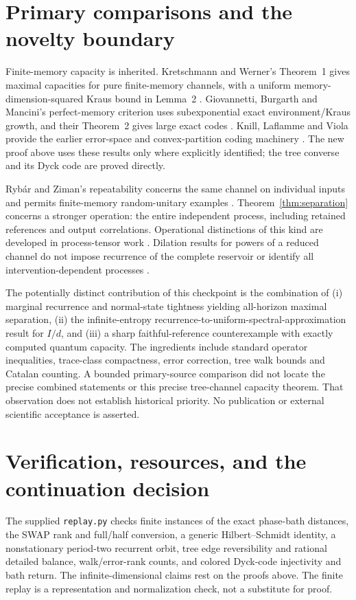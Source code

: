 \documentclass[11pt]{article}
\theoremstyle{definition}\newtheorem{definition}[theorem]{Definition}
\begin{document}
\section{Primary comparisons and the novelty boundary}

Finite-memory capacity is inherited. Kretschmann and Werner's Theorem~1 gives maximal capacities for pure finite-memory channels, with a uniform memory-dimension-squared Kraus bound in Lemma~2 \cite{KW}. Giovannetti, Burgarth and Mancini's perfect-memory criterion uses subexponential exact environment/Kraus growth, and their Theorem~2 gives large exact codes \cite{GBM}. Knill, Laflamme and Viola provide the earlier error-space and convex-partition coding machinery \cite{KLV}. The new proof above uses these results only where explicitly identified; the tree converse and its Dyck code are proved directly.

Ryb\'ar and Ziman's repeatability concerns the same channel on individual inputs and permits finite-memory random-unitary examples \cite{RZ}. Theorem~\ref{thm:separation} concerns a stronger operation: the entire independent process, including retained references and output correlations. Operational distinctions of this kind are developed in process-tensor work \cite{Pollock}. Dilation results for powers of a reduced channel do not impose recurrence of the complete reservoir or identify all intervention-dependent processes \cite{EndeDirr}.

The potentially distinct contribution of this checkpoint is the combination of (i) marginal recurrence and normal-state tightness yielding all-horizon maximal separation, (ii) the infinite-entropy recurrence-to-uniform-spectral-approximation result for $I/d$, and (iii) a sharp faithful-reference counterexample with exactly computed quantum capacity. The ingredients include standard operator inequalities, trace-class compactness, error correction, tree walk bounds and Catalan counting. A bounded primary-source comparison did not locate the precise combined statements or this precise tree-channel capacity theorem. That observation does not establish historical priority. No publication or external scientific acceptance is asserted.

\section{Verification, resources, and the continuation decision}

The supplied \texttt{replay.py} checks finite instances of the exact phase-bath distances, the SWAP rank and full/half conversion, a generic Hilbert--Schmidt identity, a nonstationary period-two recurrent orbit, tree edge reversibility and rational detailed balance, walk/error-rank counts, and colored Dyck-code injectivity and bath return. The infinite-dimensional claims rest on the proofs above. The finite replay is a representation and normalization check, not a substitute for proof.
\end{document}

